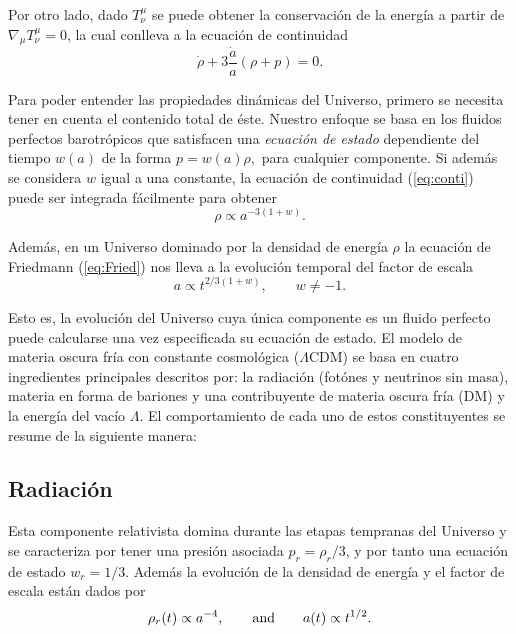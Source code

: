 \documentclass[10.5pt,prb,
               showpacs,            %
               preprintnumbers,     %
               aps,                 %
               prl,          	    %
               letterpaper,             %
               superscriptaddress,      %
               nofootinbib,         %
               tightenlines,        %
               floats,floatfix      %
               ,usenatbib]{revtex4-1}%
\def\beq{\begin{equation}}
\def\eeq{\end{equation}}
\begin{document}
Por otro lado, dado $T^{\mu}_\nu$ se puede obtener la conservaci\'on de la energ\'ia a partir de $\nabla_\mu T^\mu_\nu=0$,
la cual conlleva a la ecuaci\'on de continuidad
%
	\beq \label{eq:conti}
		\dot \rho + 3 \frac{\dot a }{a}(\rho + p) = 0.
	\eeq 

\noindent
Para poder entender las propiedades din\'amicas del Universo, primero se necesita tener en cuenta
el contenido total de \'este. Nuestro enfoque se basa en los fluidos perfectos barotr\'opicos que satisfacen 
una {\it ecuaci\'on de estado} dependiente del tiempo $w(a)$ de la forma $p = w(a)\rho,$
para cualquier componente. Si adem\'as se considera $w$ igual a una constante, la ecuaci\'on de continuidad (\ref{eq:conti})
puede ser integrada f\'acilmente para obtener
%
	\beq 
		\rho \propto a^{-3(1+w)}.
	\eeq

\noindent
Adem\'as, en un Universo dominado por la densidad de energ\'ia $\rho$ la 
ecuaci\'on de Friedmann (\ref{eq:Fried}) nos lleva a la evoluci\'on temporal del factor de escala
%
	\beq
		a \propto t^{2/3(1+w)}, \qquad  w\neq -1.
	\eeq

\noindent
Esto es, la evoluci\'on del Universo cuya \'unica componente es un fluido perfecto puede calcularse una 
vez especificada su ecuaci\'on de estado. El modelo de materia oscura fr\'ia con constante
cosmol\'ogica ($\Lambda$CDM) se basa en cuatro ingredientes principales descritos por: la 
radiaci\'on (fot\'ones y neutrinos sin masa), materia en forma de bariones y una contribuyente de materia
oscura fr\'ia (DM) y la energ\'ia del vac\'io $\Lambda$. El comportamiento de cada uno de estos
constituyentes se resume de la siguiente manera:



\subsection*{Radiaci\'on}


Esta componente relativista domina durante las etapas tempranas del Universo y 
se caracteriza por tener una presi\'on asociada $p_r=\rho_r/3$, y por tanto una ecuaci\'on de estado 
$w_r=1/3$. Adem\'as la evoluci\'on de la densidad de energ\'ia y el factor de escala est\'an dados por 
%
	\beq
		\rho_r(t) \propto a^{-4}, \qquad {\rm and} \qquad a(t)\propto t^{1/2}.
	\eeq
	
\end{document}
